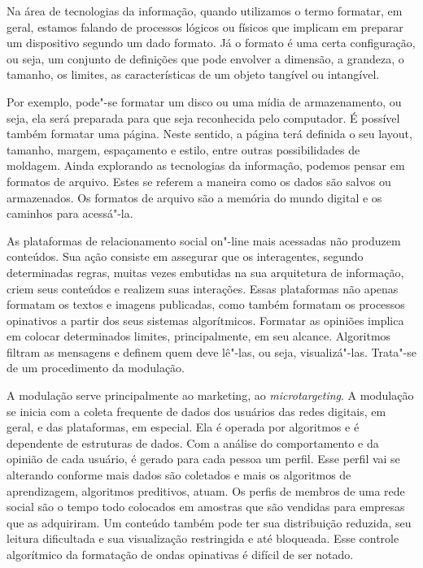 Na área de tecnologias da informação, quando utilizamos o termo
formatar, em geral, estamos falando de processos lógicos ou físicos que
implicam em preparar um dispositivo segundo um dado formato. Já o
formato é uma certa configuração, ou seja, um conjunto de definições que
pode envolver a dimensão, a grandeza, o tamanho, os limites, as
características de um objeto tangível ou intangível.

Por exemplo, pode"-se formatar um disco ou uma mídia de armazenamento, ou
seja, ela será preparada para que seja reconhecida pelo computador. É
possível também formatar uma página. Neste sentido, a página terá
definida o seu layout, tamanho, margem, espaçamento e estilo, entre
outras possibilidades de moldagem. Ainda explorando as tecnologias da
informação, podemos pensar em formatos de arquivo. Estes se referem a
maneira como os dados são salvos ou armazenados. Os formatos de arquivo
são a memória do mundo digital e os caminhos para acessá"-la.

As plataformas de relacionamento social on"-line mais acessadas não
produzem conteúdos. Sua ação consiste em assegurar que os interagentes,
segundo determinadas regras, muitas vezes embutidas na sua arquitetura
de informação, criem seus conteúdos e realizem suas interações. Essas
plataformas não apenas formatam os textos e imagens publicadas, como
também formatam os processos opinativos a partir dos seus sistemas
algorítmicos. Formatar as opiniões implica em colocar determinados
limites, principalmente, em seu alcance. Algoritmos filtram as mensagens
e definem quem deve lê"-las, ou seja, visualizá"-las. Trata"-se de um
procedimento da modulação.

A modulação serve principalmente ao marketing, ao \emph{microtargeting}.
A modulação se inicia com a coleta frequente de dados dos usuários das
redes digitais, em geral, e das plataformas, em especial. Ela é operada
por algoritmos e é dependente de estruturas de dados. Com a análise do
comportamento e da opinião de cada usuário, é gerado para cada pessoa um
perfil. Esse perfil vai se alterando conforme mais dados são coletados e
mais os algoritmos de aprendizagem, algoritmos preditivos, atuam. Os
perfis de membros de uma rede social são o tempo todo colocados em
amostras que são vendidas para empresas que as adquiriram. Um conteúdo
também pode ter sua distribuição reduzida, seu leitura dificultada e sua
visualização restringida e até bloqueada. Esse controle algorítmico da
formatação de ondas opinativas é difícil de ser notado.

